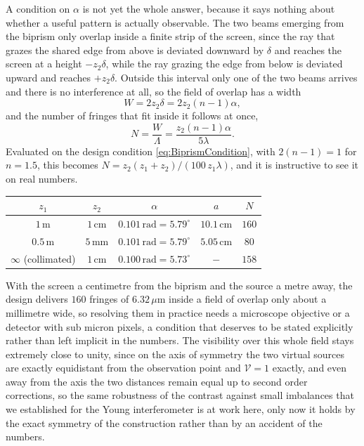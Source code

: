         A condition on $\alpha$ is not yet the whole answer, because it says nothing about whether a useful pattern is actually observable. The two beams emerging from the biprism only overlap inside a finite strip of the screen, since the ray that grazes the shared edge from above is deviated downward by $\delta$ and reaches the screen at a height $-z_2\delta$, while the ray grazing the edge from below is deviated upward and reaches $+z_2\delta$. Outside this interval only one of the two beams arrives and there is no interference at all, so the field of overlap has a width
        \begin{equation}\label{eq:BiprismWidth}
            W = 2z_2\delta = 2z_2(n-1)\alpha,
        \end{equation}
        and the number of fringes that fit inside it follows at once,
        \begin{equation}\label{eq:BiprismNumber}
            N = \frac{W}{\Lambda} = \frac{z_2(n-1)\alpha}{5\lambda}.
        \end{equation}
        Evaluated on the design condition \ref{eq:BiprismCondition}, with $2(n-1)=1$ for $n=1.5$, this becomes $N = z_2(z_1+z_2)/(100\,z_1\lambda)$, and it is instructive to see it on real numbers.

        \begin{center}
        \begin{tabular}{ccccc}
            $z_1$ & $z_2$ & $\alpha$ & $a$ & $N$ \\
            \hline
            $1\,\text{m}$ & $1\,\text{cm}$ & $0.101\,\text{rad} = 5.79^\circ$ & $10.1\,\text{cm}$ & $160$ \\
            $0.5\,\text{m}$ & $5\,\text{mm}$ & $0.101\,\text{rad} = 5.79^\circ$ & $5.05\,\text{cm}$ & $80$ \\
            $\infty$ (collimated) & $1\,\text{cm}$ & $0.100\,\text{rad} = 5.73^\circ$ & $-$ & $158$
        \end{tabular}
        \end{center}

        With the screen a centimetre from the biprism and the source a metre away, the design delivers $160$ fringes of $6.32\,\mu\text{m}$ inside a field of overlap only about a millimetre wide, so resolving them in practice needs a microscope objective or a detector with sub micron pixels, a condition that deserves to be stated explicitly rather than left implicit in the numbers. The visibility over this whole field stays extremely close to unity, since on the axis of symmetry the two virtual sources are exactly equidistant from the observation point and $\mathcal{V}=1$ exactly, and even away from the axis the two distances remain equal up to second order corrections, so the same robustness of the contrast against small imbalances that we established for the Young interferometer is at work here, only now it holds by the exact symmetry of the construction rather than by an accident of the numbers.

